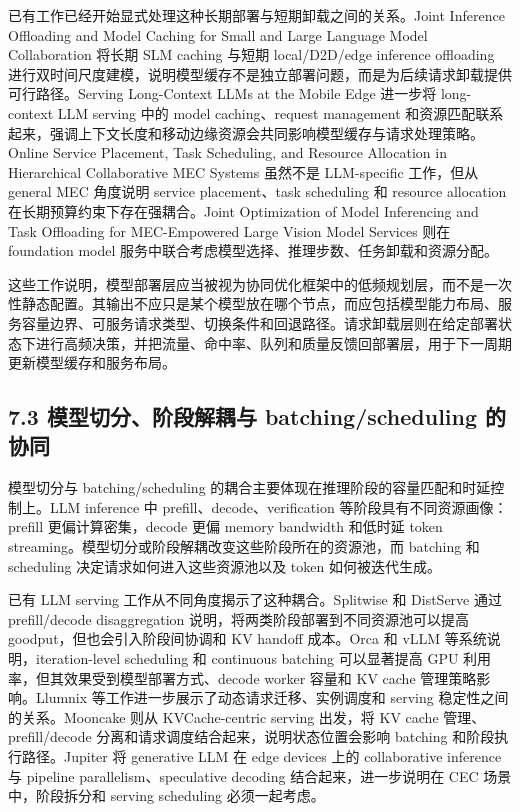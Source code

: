\documentclass[a4paper,twocolumn,10pt]{ctexart}
\begin{document}
已有工作已经开始显式处理这种长期部署与短期卸载之间的关系。Joint Inference Offloading and Model Caching for Small and Large Language Model Collaboration 将长期 SLM caching 与短期 local/D2D/edge inference offloading 进行双时间尺度建模，说明模型缓存不是独立部署问题，而是为后续请求卸载提供可行路径。Serving Long-Context LLMs at the Mobile Edge 进一步将 long-context LLM serving 中的 model caching、request management 和资源匹配联系起来，强调上下文长度和移动边缘资源会共同影响模型缓存与请求处理策略。Online Service Placement, Task Scheduling, and Resource Allocation in Hierarchical Collaborative MEC Systems 虽然不是 LLM-specific 工作，但从 general MEC 角度说明 service placement、task scheduling 和 resource allocation 在长期预算约束下存在强耦合。Joint Optimization of Model Inferencing and Task Offloading for MEC-Empowered Large Vision Model Services 则在 foundation model 服务中联合考虑模型选择、推理步数、任务卸载和资源分配。


这些工作说明，模型部署层应当被视为协同优化框架中的低频规划层，而不是一次性静态配置。其输出不应只是某个模型放在哪个节点，而应包括模型能力布局、服务容量边界、可服务请求类型、切换条件和回退路径。请求卸载层则在给定部署状态下进行高频决策，并把流量、命中率、队列和质量反馈回部署层，用于下一周期更新模型缓存和服务布局。


\subsection{7.3 模型切分、阶段解耦与 batching/scheduling 的协同}

模型切分与 batching/scheduling 的耦合主要体现在推理阶段的容量匹配和时延控制上。LLM inference 中 prefill、decode、verification 等阶段具有不同资源画像：prefill 更偏计算密集，decode 更偏 memory bandwidth 和低时延 token streaming。模型切分或阶段解耦改变这些阶段所在的资源池，而 batching 和 scheduling 决定请求如何进入这些资源池以及 token 如何被迭代生成。


已有 LLM serving 工作从不同角度揭示了这种耦合。Splitwise 和 DistServe 通过 prefill/decode disaggregation 说明，将两类阶段部署到不同资源池可以提高 goodput，但也会引入阶段间协调和 KV handoff 成本。Orca 和 vLLM 等系统说明，iteration-level scheduling 和 continuous batching 可以显著提高 GPU 利用率，但其效果受到模型部署方式、decode worker 容量和 KV cache 管理策略影响。Llumnix 等工作进一步展示了动态请求迁移、实例调度和 serving 稳定性之间的关系。Mooncake 则从 KVCache-centric serving 出发，将 KV cache 管理、prefill/decode 分离和请求调度结合起来，说明状态位置会影响 batching 和阶段执行路径。Jupiter 将 generative LLM 在 edge devices 上的 collaborative inference 与 pipeline parallelism、speculative decoding 结合起来，进一步说明在 CEC 场景中，阶段拆分和 serving scheduling 必须一起考虑。
\end{document}
